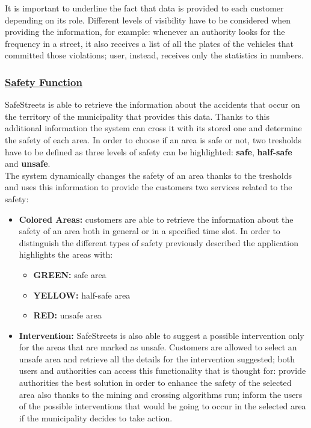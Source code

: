 	It is important to underline the fact that data is provided to each customer depending on its role. Different levels of visibility have to be considered when providing the information, for example: whenever an authority looks for the frequency in a street, it also receives a list of all the plates of the vehicles that committed those violations; user, instead, receives only the statistics in numbers. 
	
	\subsubsection[Safety Function]{\hyperlink{toc}{Safety Function}}
		SafeStreets is able to retrieve the information about the accidents that occur on the territory of the municipality that provides this data. Thanks to this additional information the system can cross it with its stored one and determine the safety of each area. In order to choose if an area is safe or not, two tresholds have to be defined as three levels of safety can be highlighted: \textbf{safe}, \textbf{half-safe} and \textbf{unsafe}.\\
		
		The system dynamically changes the safety of an area thanks to the tresholds and uses this information to provide the customers two services related to the safety:
		
		\begin{itemize}
			\item \textbf{Colored Areas:} customers are able to retrieve the information about the safety of an area both in general or in a specified time slot. In order to distinguish the different types of safety previously described the application highlights the areas with:
			\begin{itemize}
				\item \textbf{GREEN:} safe area
				\item \textbf{YELLOW:} half-safe area
				\item \textbf{RED:} unsafe area
			\end{itemize} 
		
			\item \textbf{Intervention:} SafeStreets is also able to suggest a possible intervention only for the areas that are marked as unsafe. Customers are allowed to select an unsafe area and retrieve all the details for the intervention suggested; both users and authorities can access this functionality that is thought for: provide authorities the best solution in order to enhance the safety of the selected area also thanks to the mining and crossing algorithms run; inform the users of the possible interventions that would be going to occur in the selected area if the municipality decides to take action.
		\end{itemize}
		
